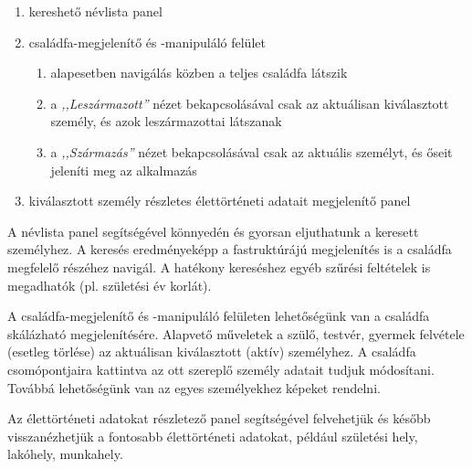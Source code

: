 \begin{enumerate}
 \item kereshető névlista panel
 \item családfa-megjelenítő és -manipuláló felület
  \begin{enumerate}
   \item alapesetben navigálás közben a teljes családfa látszik
   \item a \emph{,,Leszármazott''} nézet bekapcsolásával csak az aktuálisan kiválasztott személy, és azok leszármazottai látszanak
   \item a \emph{,,Származás''} nézet bekapcsolásával csak az aktuális személyt, és őseit jeleníti meg az alkalmazás
  \end{enumerate}
 \item kiválasztott személy részletes élettörténeti adatait megjelenítő panel
\end{enumerate}

A névlista panel segítségével könnyedén és gyorsan eljuthatunk a keresett személyhez. A keresés eredményeképp a fastruktúrájú megjelenítés is a családfa megfelelő részéhez navigál. A hatékony kereséshez egyéb szűrési feltételek is megadhatók (pl. születési év korlát).

A családfa-megjelenítő és -manipuláló felületen lehetőségünk van a családfa skálázható megjelenítésére. Alapvető műveletek a szülő, testvér, gyermek felvétele (esetleg törlése) az aktuálisan kiválasztott (aktív) személyhez. A családfa csomópontjaira kattintva az ott szereplő személy adatait tudjuk módosítani. Továbbá lehetőségünk van az egyes személyekhez képeket rendelni.

Az élettörténeti adatokat részletező panel segítségével felvehetjük és később visszanézhetjük a fontosabb élettörténeti adatokat, például születési hely, lakóhely, munkahely.
